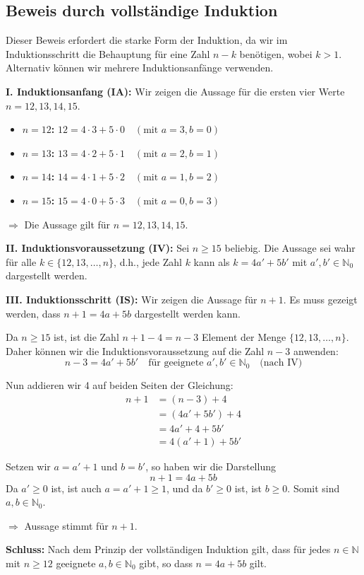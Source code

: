 \documentclass{article}
\begin{document}
\subsection*{Beweis durch vollständige Induktion}

Dieser Beweis erfordert die starke Form der Induktion, da wir im Induktionsschritt die Behauptung für eine Zahl $n-k$ benötigen, wobei $k > 1$. Alternativ können wir mehrere Induktionsanfänge verwenden.

\textbf{I. Induktionsanfang (IA):} Wir zeigen die Aussage für die ersten vier Werte $n=12, 13, 14, 15$.
\begin{itemize}
	\item \textbf{$n=12$:} $12 = 4 \cdot 3 + 5 \cdot 0 \quad (\text{mit } a=3, b=0)$
	\item \textbf{$n=13$:} $13 = 4 \cdot 2 + 5 \cdot 1 \quad (\text{mit } a=2, b=1)$
	\item \textbf{$n=14$:} $14 = 4 \cdot 1 + 5 \cdot 2 \quad (\text{mit } a=1, b=2)$
	\item \textbf{$n=15$:} $15 = 4 \cdot 0 + 5 \cdot 3 \quad (\text{mit } a=0, b=3)$
\end{itemize}
\(\Rightarrow\) Die Aussage gilt für $n=12, 13, 14, 15$.

\bigskip

\textbf{II. Induktionsvoraussetzung (IV):}
Sei $n \geq 15$ beliebig. Die Aussage sei wahr für alle $k \in \{12, 13, \dots, n\}$, d.h., jede Zahl $k$ kann als $k = 4a' + 5b'$ mit $a', b' \in \mathbb{N}_0$ dargestellt werden.

\bigskip

\textbf{III. Induktionsschritt (IS):}
Wir zeigen die Aussage für $n+1$. Es muss gezeigt werden, dass $n+1 = 4a + 5b$ dargestellt werden kann.

Da $n \geq 15$ ist, ist die Zahl $n+1-4 = n-3$ Element der Menge $\{12, 13, \dots, n\}$.
Daher können wir die Induktionsvoraussetzung auf die Zahl $n-3$ anwenden:
\[
	n-3 = 4a' + 5b' \quad \text{für geeignete } a', b' \in \mathbb{N}_0 \quad \text{(nach IV)}
\]

Nun addieren wir 4 auf beiden Seiten der Gleichung:
\begin{align*}
	n+1 & = (n-3) + 4       \\
	    & = (4a' + 5b') + 4 \\
	    & = 4a' + 4 + 5b'   \\
	    & = 4(a' + 1) + 5b'
\end{align*}

Setzen wir $a = a' + 1$ und $b = b'$, so haben wir die Darstellung
\[
	n+1 = 4a + 5b
\]
Da $a' \geq 0$ ist, ist auch $a = a' + 1 \geq 1$, und da $b' \geq 0$ ist, ist $b \geq 0$. Somit sind $a, b \in \mathbb{N}_0$.

\(\Rightarrow\) Aussage stimmt für \( n+1 \).

\bigskip

\textbf{Schluss:}
Nach dem Prinzip der vollständigen Induktion gilt, dass für jedes $n \in \mathbb{N}$ mit $n \geq 12$ geeignete $a, b \in \mathbb{N}_0$ gibt, so dass $n = 4a + 5b$ gilt.
\end{document}
